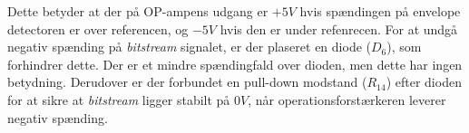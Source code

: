 Dette betyder at der på OP-ampens udgang er $+5V$ hvis spændingen på envelope detectoren er over referencen, og $-5V$ hvis den er under refenrecen. For at undgå negativ spænding på \textit{bitstream} signalet, er der plaseret en diode ($D_{6}$), som forhindrer dette. Der er et mindre spændingfald over dioden, men dette har ingen betydning. Derudover er der forbundet en pull-down modstand ($R_{14}$) efter dioden for at sikre at \textit{bitstream} ligger stabilt på $0V$, når operationsforstærkeren leverer negativ spænding.

\clearpage